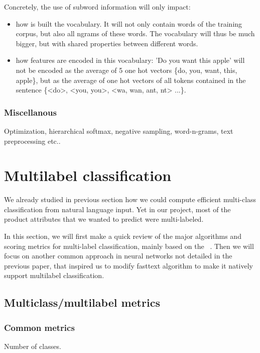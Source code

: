 Concretely, the use of subword information will only impact:
\begin{itemize}
	\item how is built the vocabulary. It will not only contain words of the training corpus, but also all ngrams of these words. The vocabulary will thus be much bigger, but with shared properties between different words.
	\item how features are encoded in this vocabulary: 'Do you want this apple' will not be encoded as the average of 5 one hot vectors \{do, you, want, this, apple\}, but as the average of one hot vectors of all tokens contained in the sentence \{<do>, <you, you>, <wa, wan, ant, nt> ...\}.
\end{itemize}

\subsubsection{Miscellanous}

Optimization, hierarchical softmax, negative sampling, word-n-grams, text preprocessing etc..


\pagebreak
\section{Multilabel classification}

We already studied in previous section how we could compute efficient multi-class classification from natural language input. Yet in our project, most of the product attributes that we wanted to predict were multi-labeled.

In this section, we will first make a quick review of the major algorithms and scoring metrics for multi-label classification, mainly based on the ~\cite[following paper]{MultilabelReview}. Then we will focus on another common approach in neural networks not detailed in the previous paper, that inspired us to modify fasttext algorithm to make it natively support multilabel classification.


\subsection{Multiclass/multilabel metrics}

\subsubsection{Common metrics}

Number of classes.

